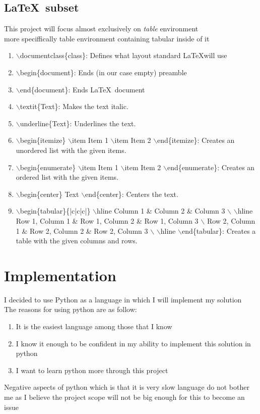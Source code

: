 \documentclass[12pt]{article}
\begin{document}
\subsection{\LaTeX \, subset}
This project will focus almost exclusively on \emph{table} environment \\
more speciffically table environment containing tabular inside of it 
\begin{enumerate}
    \item $\backslash$documentclass\{class\}: Defines what layout standard \LaTeX will use 
    \item $\backslash$begin\{document\}: Ends (in our case empty) preamble
    \item $\backslash$end\{document\}: Ends \LaTeX \, document
    \item $\backslash$textit\{Text\}: Makes the text italic.
    \item $\backslash$underline\{Text\}: Underlines the text.
    \item $\backslash$begin\{itemize\} $\backslash$item Item 1 $\backslash$item Item 2 $\backslash$end\{itemize\}: Creates an unordered list with the given items.
    \item  $\backslash$begin\{enumerate\} $\backslash$item Item 1 $\backslash$item Item 2 $\backslash$end\{enumerate\}: Creates an ordered list with the given items.
    \item  $\backslash$begin\{center\} Text $\backslash$end\{center\}: Centers the text.
    \item  $\backslash$begin\{tabular\}\{|c|c|c|\} $\backslash$hline Column 1 \& Column 2 \& Column 3 $\backslash$ $\backslash$hline Row 1, Column 1 \& Row 1, Column 2 \& Row 1, Column 3 $\backslash$ Row 2, Column 1 \& Row 2, Column 2 \& Row 2, Column 3 $\backslash$ $\backslash$hline $\backslash$end\{tabular\}: Creates a table with the given columns and rows.
\end{enumerate}
\section{Implementation}
I decided to use Python as a language in which I will implement my solution \\ 
The reasons for using python are as follow:
\begin{enumerate}
    \item It is the easiest language among those that I know
    \item I know it enough to be confident in my ability to implement this solution in python
    \item I want to learn python more through this project
\end{enumerate}
Negative aspects of python which is that it is very slow language do not bother me as I believe the project scope will not be big enough for this to become an issue
  
\end{document}

